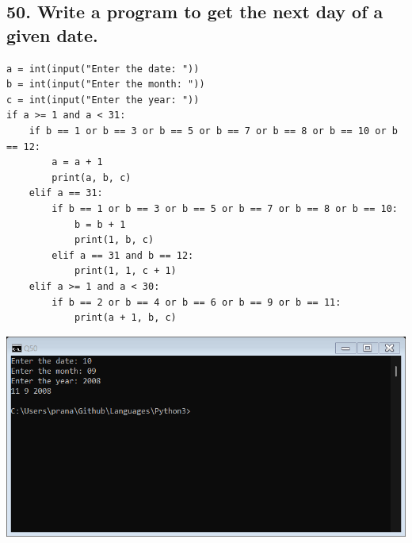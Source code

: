 \documentclass[12pt]{article}
\begin{document}
\subsection*{50. Write a program to get the next day of a given date.}
\begin{verbatim}
a = int(input("Enter the date: "))
b = int(input("Enter the month: "))
c = int(input("Enter the year: "))
if a >= 1 and a < 31:
    if b == 1 or b == 3 or b == 5 or b == 7 or b == 8 or b == 10 or b == 12:
        a = a + 1
        print(a, b, c)
    elif a == 31:
        if b == 1 or b == 3 or b == 5 or b == 7 or b == 8 or b == 10:
            b = b + 1
            print(1, b, c)
        elif a == 31 and b == 12:
            print(1, 1, c + 1)
    elif a >= 1 and a < 30:
        if b == 2 or b == 4 or b == 6 or b == 9 or b == 11:
            print(a + 1, b, c)
\end{verbatim}
\includegraphics[width=\linewidth]{images/50.png}
\end{document}
